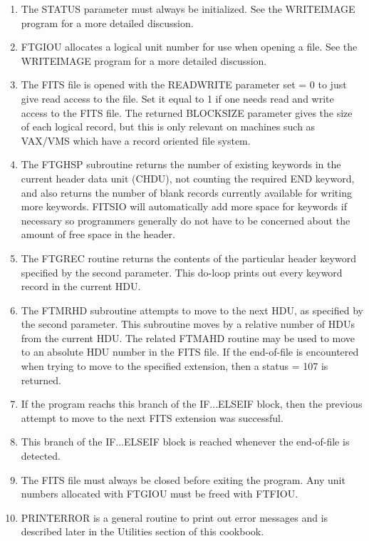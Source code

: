 \begin{enumerate}

\item
The STATUS parameter must always be initialized.  See the WRITEIMAGE 
program for a more detailed discussion.


\item
FTGIOU allocates a logical unit number for use when opening a file.
See the WRITEIMAGE program for a more detailed discussion.

\item
The FITS file is opened with the READWRITE parameter set
= 0 to just give read access to the file.  Set it equal to 1 if one
needs read and write access to the FITS file.  The returned BLOCKSIZE
parameter gives the size of each logical record, but
this is only relevant on machines such as VAX/VMS which have a record
oriented file system.

\item
The FTGHSP subroutine returns the number of existing keywords in the
current header data unit (CHDU), not counting the required END keyword,
and also returns the number of blank records currently available for
writing more keywords.  FITSIO will automatically add more space for
keywords if necessary so programmers generally do not have to be
concerned about the amount of free space in the header.

\item
The FTGREC routine returns the contents of the particular header
keyword specified by the second parameter.  This do-loop prints out
every keyword record in the current HDU.

\item
The FTMRHD subroutine attempts to move to the next HDU, as specified by
the second parameter.   This subroutine moves by a relative number of
HDUs from the current HDU.  The related FTMAHD routine may be used to
move to an absolute HDU number in the FITS file.  If the end-of-file is
encountered when trying to move to the specified extension, then a
status = 107 is returned.
\item
If the program reachs this branch of the IF...ELSEIF block,
then the previous attempt to move to the next FITS extension was
successful.  

\item
This branch of the IF...ELSEIF block is reached whenever the end-of-file
is detected.

\item
The FITS file must always be closed before exiting the program. 
Any unit numbers allocated with FTGIOU must be freed with FTFIOU.
\item
PRINTERROR is a general routine to print out error messages and is
described later in the Utilities section of this cookbook.
\end{enumerate}

